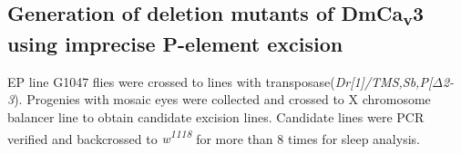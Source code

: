 \subsection*{Generation of deletion mutants of DmCa\textsubscript{v}3 using imprecise P-element excision}

EP line G1047 flies were crossed to lines with transposase(\emph{Dr[1]/TMS,Sb,P[$\Delta$2-3}). Progenies with mosaic eyes were collected and crossed to X chromosome balancer line to obtain candidate excision lines. Candidate lines were PCR verified and backcrossed to \emph{w\textsuperscript{1118}} for more than 8 times for sleep analysis.

  